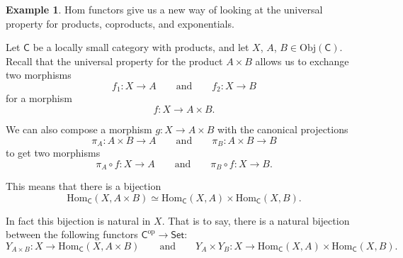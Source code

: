 \documentclass[a4paper]{report}
\newcommand{\Obj}{\mathrm{Obj}}
\newcommand{\Hom}{\mathrm{Hom}}
\theoremstyle{definition}
\newtheorem{example}{Example}[section]
\theoremstyle{plain}
\theoremstyle{remark}
\begin{document}
\begin{example}
  \label{eg:naturaltransformationsforcccs}
  Hom functors give us a new way of looking at the universal property for products, coproducts, and exponentials.

  Let $\mathsf{C}$ be a locally small category with products, and let $X$, $A$, $B \in \Obj(\mathsf{C})$. Recall that the universal property for the product $A \times B$ allows us to exchange two morphisms
  \begin{equation*}
    f_{1}\colon X \to A\qquad\text{and}\qquad f_{2}\colon X \to B
  \end{equation*}
  for a morphism
  \begin{equation*}
    f\colon X \to A \times B.
  \end{equation*}

  We can also compose a morphism $g\colon X \to A \times B$ with the canonical projections
  \begin{equation*}
    \pi_{A}\colon A \times B \to A \qquad\text{and}\qquad \pi_{B}\colon A \times B \to B
  \end{equation*}
  to get two morphisms
  \begin{equation*}
    \pi_{A} \circ f\colon X \to A\qquad\text{and}\qquad \pi_{B} \circ f\colon X \to B.
  \end{equation*}

  This means that there is a bijection 
  \begin{equation*}
    \Hom_{\mathsf{C}}(X, A \times B) \simeq \Hom_{\mathsf{C}}(X, A) \times \Hom_{\mathsf{C}}(X, B).
  \end{equation*}

  In fact this bijection is natural in $X$. That is to say, there is a natural bijection between the following functors $\mathsf{C}^{\mathrm{op}} \to \mathsf{Set}$:
  \begin{equation*}
    Y_{A \times B}\colon X \to \Hom_{\mathsf{C}}(X, A \times B)\qquad\text{and}\qquad Y_{A} \times Y_{B}\colon X \to \Hom_{\mathsf{C}}(X, A) \times \Hom_{\mathsf{C}}(X, B).
  \end{equation*}


\end{example}
\end{document}
